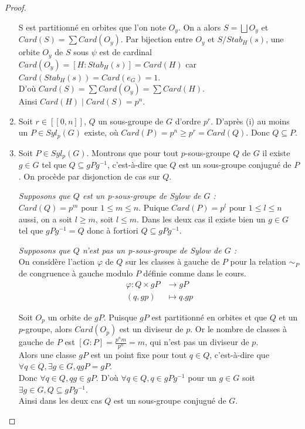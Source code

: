 \documentclass{article}
\theoremstyle{definition}
\theoremstyle{plain}
\theoremstyle{plain}
\theoremstyle{plain}
\theoremstyle{plain}
\theoremstyle{definition}
\theoremstyle{plain}
\theoremstyle{plain}
\begin{document}
\begin{proof}
\begin{enumerate}[label={\upshape(\roman*)}]
S est partitionné en orbites que l'on note \( O_y \). On a alors \( S = \bigsqcup O_{y} \) et 
\( Card(S) = \sum Card(O_{y}) \).
Par bijection entre \( O_y \) et \( S/Stab_H(s) \), une orbite \( O_y \) de \( S \) sous \( \psi \) est de cardinal \( Card(O_y) = [H : Stab_{H}({s}) ] = Card(H) \) car \( Card(Stab_{H}({s})) = Card(e_{G}) = 1 \). \\
D'où \( Card(S) = \sum Card(O_{y}) = \sum Card(H) \). \\
Ainsi \( Card(H) \mid Card(S) = p^{n} \).

\item Soit \( r \in [\![0,n]\!] \), \( Q \) un sous-groupe de \( G \) d'ordre \( p^{r} \). 
D'après (i) au moins un \( P \in Syl_p(G) \) existe, où \( Card(P) = p^{n} \geq p ^{r} = Card(Q) \).
Donc \( Q \subseteq P \).

\item Soit \( P \in Syl_{p}({G}) \). Montrons que pour tout \(p\)-sous-groupe \( Q \) de \( G \) il existe \( g \in G \) tel que \( Q \subseteq gPg^{-1} \), c'est-à-dire que \( Q \) est un sous-groupe conjugué de \( P \). On procède par disjonction de cas sur \( Q \).
	\par \textit{Supposons que \( Q \) est un p-sous-groupe de Sylow de \( G \) :}\\
	\( Card(Q) = p^{m}\) pour \( 1 \le m \le n \). Puique \( Card(P) = p^{l}\) pour 
	\( 1 \le l \le n \) aussi, on a soit \( l \ge m \), soit \( l \le m \). Dans les 
	deux cas il existe bien un \( g \in G \) tel que 
	\( gPg^{-1} = Q \) donc à fortiori \( Q \subseteq gPg^{-1} \).
	
	\par \textit{Supposons que \( Q \) n'est pas un p-sous-groupe de Sylow de \( G \) :}\\ On considère l'action \( \varphi \) de \( Q \) sur les classes à gauche de \( P \) pour la relation \( \sim_{P} \) de congruence à gauche modulo \( P \) définie comme dans le cours. 
\begin{align*}
	\varphi : Q \times gP &\to gP \\
	(q,gp) &\mapsto q.gp
\end{align*}

Soit \( O_{p} \) un orbite de \( gP \). Puisque \( gP \) est partitionné en orbites et que \( Q \) et un \(p\)-groupe, alors \( Card(O_{p}) \) est un diviseur de \( p \). Or le nombre de classes à gauche de \( P \) est \([G : P] = \frac{p^{n}m}{p^{n}} = m  \), qui n'est pas un diviseur de \( p \). \\
Alors une classe \( gP \) est un point fixe pour tout \( q \in Q \), c'est-à-dire que \( \forall q \in Q, \exists g \in G, qgP = gP \). \\
Donc \( \forall q \in Q, qg \in gP \). D'où \( \forall q \in Q, q \in gPg^{-1} \) pour un \( g \in G \) soit \(\exists g \in G, Q \subseteq gPg^{-1} \).\\ 
Ainsi dans les deux cas \( Q \) est un sous-groupe conjugué de \( G \).


\end{enumerate}
\end{proof}
\end{document}
